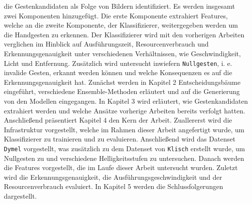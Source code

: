 die Gestenkandidaten als Folge von Bildern identifiziert. Es werden insgesamt zwei Komponenten hinzugefügt. Die erste Komponente extrahiert Features, welche an die zweite Komponente,
der Klassifizierer, weitergegeben werden um die Handgesten zu erkennen. Der Klassifizierer wird mit den vorherigen Arbeiten verglichen im Hinblick auf Ausführungszeit, Resourcenverbrauch
und Erkennungsgenauigkeit unter verschiedenen Verhältnissen, wie Geschwindigkeit, Licht und Entfernung. Zusätzlich wird untersucht inwiefern \texttt{Nullgesten}, i. e. invalide Gesten,
erkannt werden können und welche Konsequenzen es auf die Erkennungsgenauigkeit hat.
\newline
\newline
Zunächst werden in Kapitel 2 Entscheidungsbäume eingeführt, verschiedene Ensemble-Methoden erläutert und auf die Generierung von den Modellen eingegangen.
In Kapitel 3 wird erläutert, wie Gestenkandidaten extrahiert werden und welche Ansätze vorherige Arbeiten bereits verfolgt hatten.
Anschließend präsentiert Kapitel 4 den Kern der Arbeit. Zuallererst wird die Infrastruktur vorgestellt, welche im Rahmen dieser Arbeit angefertigt wurde, um
Klassifizierer zu trainieren und zu evaluieren. Anschließend wird das Datenset \texttt{Dymel} vorgestellt, was zusätzlich zu dem Datenset von \texttt{Klisch}
erstellt wurde, um Nullgesten zu und verschiedene Helligkeitsstufen zu untersuchen. Danach werden die Features vorgestellt, die im Laufe dieser Arbeit untersucht wurden.
Zuletzt wird die Erkennungsgenauigkeit, die Ausführungsgeschwindigkeit und der Resourcenverbrauch evaluiert.
In Kapitel 5 werden die Schlussfolgerungen dargestellt.